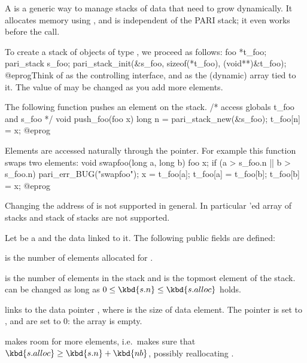 A  is a generic way to manage stacks of data that need
to grow dynamically. It allocates memory using , and is
independent of the PARI stack; it even works before the  call.


To create a stack of objects of type , we proceed as follows:
\bprog
foo *t_foo;
pari_stack s_foo;
pari_stack_init(&s_foo, sizeof(*t_foo), (void**)&t_foo);
@eprog\noindent Think of  as the controlling interface, and
 as the (dynamic) array tied to it. The value of 
may be changed as you add more elements.

The following function pushes an element on the stack.
\bprog
/* access globals t_foo and s_foo */
void push_foo(foo x)
{
  long n = pari_stack_new(&s_foo);
  t_foo[n] = x;
}
@eprog


Elements are accessed naturally through the  pointer.
For example this function swaps two elements:
\bprog
void swapfoo(long a, long b)
{
  foo x;
  if (a > s_foo.n || b > s_foo.n) pari_err_BUG("swapfoo");
  x        = t_foo[a];
  t_foo[a] = t_foo[b];
  t_foo[b] = x;
}
@eprog

Changing the address of  is not supported in general.
In particular 'ed array of stacks and stack of stacks are not
supported.

Let  be a  and  the data linked to it. The
following public fields are defined:

\item {} is the number of elements allocated for .

\item {} is the number of elements in the stack and  is
the topmost element of the stack.   can be changed as long as
$0\leq\kbd{s.n}\leq\kbd{s.alloc}$ holds.

 links
 to the data pointer , where  is the size of
data element. The pointer  is set to ,  and
 are set to $0$: the array is empty.

 makes room for 
more elements, i.e.~makes sure that $\kbd{s.alloc}\geq\kbd{s.n} + \kbd{nb}$,
possibly reallocating .

